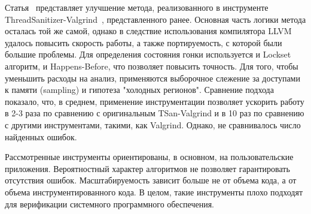 Статья~\cite{Serebryany:2011} представляет улучшение метода, реализованного в инструменте ThreadSanitizer-Valgrind~\cite{TSan}, представленного ранее.
Основная часть логики метода осталась той же самой, однако в следствие использования компилятора LLVM удалось повысить скорость работы, а также портируемость, с которой были большие проблемы. 
Для определения состояния гонки используется и Lockset алгоритм, и Happens-Before, что позволяет повысить точность. 
Для того, чтобы уменьшить расходы на анализ, применяются выборочное слежение за доступами к памяти (sampling) и гипотеза "холодных регионов".
Сравнение подхода показало, что, в среднем, применение инструментации позволяет ускорить работу в 2-3 раза по сравнению с оригинальным TSan-Valgrind и в 10 раз по сравнению с другими инструментами, такими, как Valgrind. Однако, не сравнивалось число найденных ошибок. 

Рассмотренные инструменты ориентированы, в основном, на пользовательские приложения. 
Вероятностный характер алгоритмов не позволяет гарантировать отсутствия ошибок.
Масштабируемость зависит больше не от объема кода, а от объема инструментированного кода. 
В целом, такие инструменты плохо подходят для верификации системного программного обеспечения.


